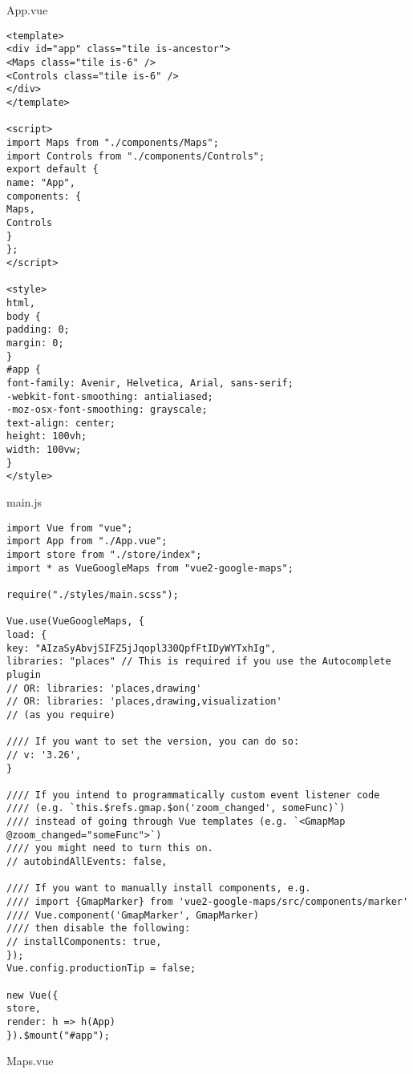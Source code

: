 \chapter{}
\label{ch:broncode_frontend}
App.vue
\begin{lstlisting}
<template>
<div id="app" class="tile is-ancestor">
<Maps class="tile is-6" />
<Controls class="tile is-6" />
</div>
</template>

<script>
import Maps from "./components/Maps";
import Controls from "./components/Controls";
export default {
name: "App",
components: {
Maps,
Controls
}
};
</script>

<style>
html,
body {
padding: 0;
margin: 0;
}
#app {
font-family: Avenir, Helvetica, Arial, sans-serif;
-webkit-font-smoothing: antialiased;
-moz-osx-font-smoothing: grayscale;
text-align: center;
height: 100vh;
width: 100vw;
}
</style>
\end{lstlisting}
main.js
\begin{lstlisting}
import Vue from "vue";
import App from "./App.vue";
import store from "./store/index";
import * as VueGoogleMaps from "vue2-google-maps";

require("./styles/main.scss");

Vue.use(VueGoogleMaps, {
load: {
key: "AIzaSyAbvjSIFZ5jJqopl330QpfFtIDyWYTxhIg",
libraries: "places" // This is required if you use the Autocomplete plugin
// OR: libraries: 'places,drawing'
// OR: libraries: 'places,drawing,visualization'
// (as you require)

//// If you want to set the version, you can do so:
// v: '3.26',
}

//// If you intend to programmatically custom event listener code
//// (e.g. `this.$refs.gmap.$on('zoom_changed', someFunc)`)
//// instead of going through Vue templates (e.g. `<GmapMap @zoom_changed="someFunc">`)
//// you might need to turn this on.
// autobindAllEvents: false,

//// If you want to manually install components, e.g.
//// import {GmapMarker} from 'vue2-google-maps/src/components/marker'
//// Vue.component('GmapMarker', GmapMarker)
//// then disable the following:
// installComponents: true,
});
Vue.config.productionTip = false;

new Vue({
store,
render: h => h(App)
}).$mount("#app");
\end{lstlisting}
Maps.vue
